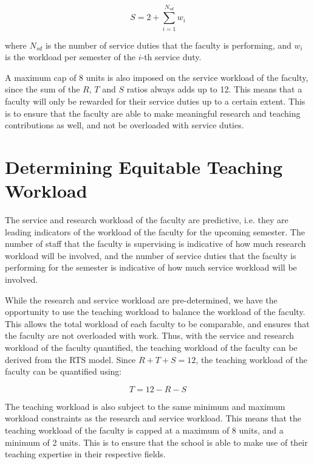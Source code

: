 \begin{equation}
  S = 2 + \sum_{i=1}^{N_{sd}} w_i
\end{equation}

where $N_{sd}$ is the number of service duties that the faculty is performing, and $w_i$ is the workload per semester of the $i$-th service duty.

A maximum cap of 8 units is also imposed on the service workload of the faculty, since the sum of the $R$, $T$ and $S$ ratios always adds up to 12. This means that a faculty will only be rewarded for their service duties up to a certain extent. This is to ensure that the faculty are able to make meaningful research and teaching contributions as well, and not be overloaded with service duties.

\section{Determining Equitable Teaching Workload}
\label{sec:determining_equitable_teaching_workload}

The service and research workload of the faculty are predictive, i.e. they are leading indicators of the workload of the faculty for the upcoming semester. The number of staff that the faculty is supervising is indicative of how much research workload will be involved, and the number of service duties that the faculty is performing for the semester is indicative of how much service workload will be involved.

While the research and service workload are pre-determined, we have the opportunity to use the teaching workload to balance the workload of the faculty. This allows the total workload of each faculty to be comparable, and ensures that the faculty are not overloaded with work. Thus, with the service and research workload of the faculty quantified, the teaching workload of the faculty can be derived from the RTS model. Since $R + T + S = 12$, the teaching workload of the faculty can be quantified using:

\begin{equation}
  T = 12 - R - S
\end{equation}

The teaching workload is also subject to the same minimum and maximum workload constraints as the research and service workload. This means that the teaching workload of the faculty is capped at a maximum of 8 units, and a minimum of 2 units. This is to ensure that the school is able to make use of their teaching expertise in their respective fields.


